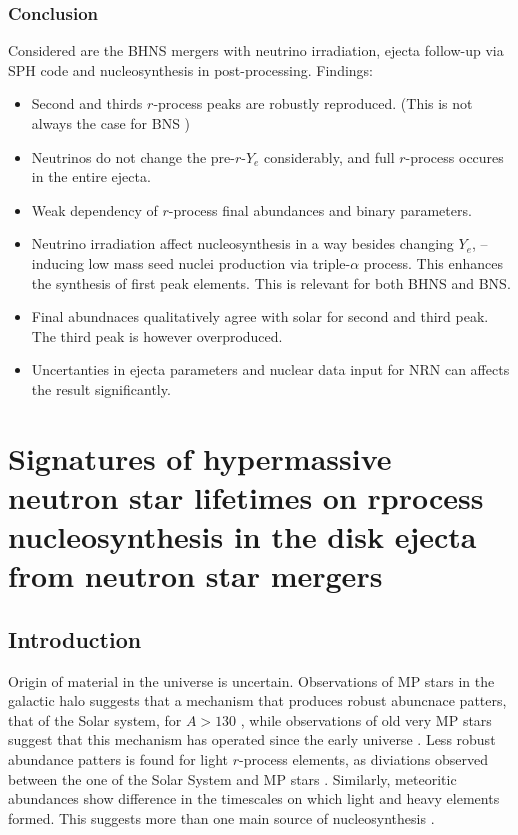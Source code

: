 \subsubsection{Conclusion}
Considered are the \ac{BHNS} mergers with neutrino irradiation, ejecta follow-up via \ac{SPH} code and nucleosynthesis in post-processing. 
Findings: 
\begin{itemize}
    \item Second and thirds $r$-process peaks are robustly reproduced. (This is not always the case for \ac{BNS} )
    \item Neutrinos do not change the pre-$r$-$Y_e$ considerably, and full $r$-process occures in the entire ejecta. 
    \item Weak dependency of $r$-process final abundances and binary parameters.
    \item Neutrino irradiation affect nucleosynthesis in a way besides changing $Y_e$, -- inducing low mass seed nuclei production via triple-$\alpha$ process. This enhances the synthesis of first peak elements. This is relevant for both \ac{BHNS} and \ac{BNS}. 
    \item Final abundnaces qualitatively agree with solar for second and third peak. The third peak is however overproduced. 
    \item Uncertanties in ejecta parameters and nuclear data input for \ac{NRN} can affects the result significantly.
\end{itemize}



\section{Signatures of hypermassive neutron star lifetimes on rprocess nucleosynthesis in the disk ejecta from neutron star mergers}



\subsection{Introduction}

Origin of \rproc{} material in the universe is uncertain. Observations of \ac{MP} stars in the galactic halo suggests that a mechanism that produces robust abuncnace patters, that of the Solar system, for $A>130$ \cite{(e.g., Sneden et al., 2008).}, while observations of old very \ac{MP} stars suggest that this mechanism has operated since the early universe \cite{(e.g., Cowan et al., 1999; Ji et al., 2016)}. Less robust abundance patters is found for light $r$-process elements, as diviations observed between the one of the Solar System and \ac{MP} stars \cite{(e.g., Montes et al., 2007).}. Similarly, meteoritic abundances show difference in the timescales on which light and heavy \rproc{} elements formed. This suggests more than one main source of \rproc{} nucleosynthesis \cite{Wasserburg et al., 1996}.

